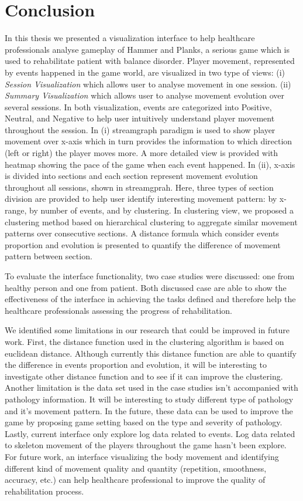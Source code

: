 \chapter{Conclusion}

In this thesis we presented a visualization interface to help healthcare professionals analyse gameplay of Hammer and Planks, a serious game which is used to rehabilitate patient with balance disorder. Player movement, represented by events happened in the game world, are visualized in two type of views: (i) \textit{Session Visualization} which allows user to analyse movement in one session. (ii) \textit{Summary Visualization} which allows user to analyse movement evolution over several sessions. In both visualization, events are categorized into Positive, Neutral, and Negative to help user intuitively understand player movement throughout the session. In (i) streamgraph paradigm is used to show player movement over x-axis which in turn provides the information to which direction (left or right) the player moves more. A more detailed view is provided with heatmap showing the pace of the game when each event happened. In (ii), x-axis is divided into sections and each section represent movement evolution throughout all sessions, shown in streamgprah. Here, three types of section division are provided to help user identify interesting movement pattern: by x-range, by number of events, and by clustering. In clustering view, we proposed a clustering method based on hierarchical clustering to aggregate similar movement patterns over consecutive sections. A distance formula which consider events proportion and evolution is presented to quantify the difference of movement pattern between section.

To evaluate the interface functionality, two case studies were discussed: one from healthy person and one from patient. Both discussed case are able to show the effectiveness of the interface in achieving the tasks defined and therefore help the healthcare professionals assessing the progress of rehabilitation.

We identified some limitations in our research that could be improved in future work. First, the distance function used in the clustering algorithm is based on euclidean distance. Although currently this distance function are able to quantify the difference in events proportion and evolution, it will be interesting to investigate other distance function and to see if it can improve the clustering. Another limitation is the data set used in the case studies isn't accompanied with pathology information. It will be interesting to study different type of pathology and it's movement pattern. In the future, these data can be used to improve the game by proposing game setting based on the type and severity of pathology. Lastly, current interface only explore log data related to events. Log data related to skeleton movement of the players throughout the game hasn't been explore. For future work, an interface visualizing the body movement and identifying different kind of movement quality and quantity (repetition, smoothness, accuracy, etc.) can help healthcare professional to improve the quality of rehabilitation process.


